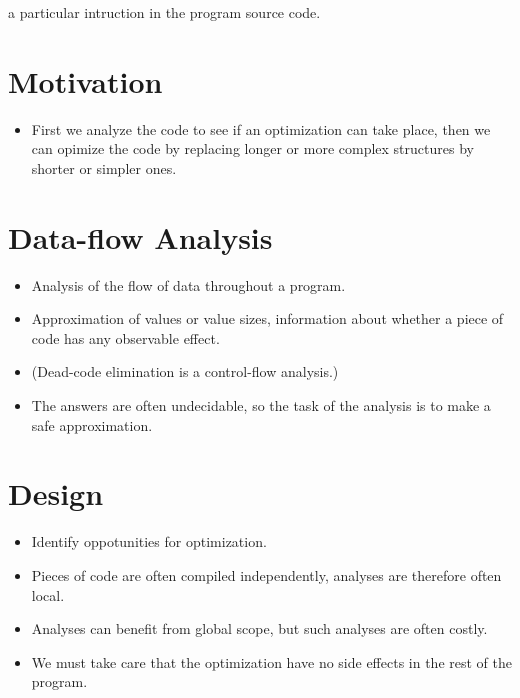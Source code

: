 \tableofcontents

\begin{description}[\setleftmargin{20pt}\setlabelstyle{\bf}\breaklabel]

\item [Program point] a particular intruction in the program source code.

\end{description}

\section{Motivation}

\begin{itemize}

\item First we analyze the code to see if an optimization can take place, then
we can opimize the code by replacing longer or more complex structures by
shorter or simpler ones.

\end{itemize}

\section{Data-flow Analysis}

\begin{itemize}

\item Analysis of the flow of data throughout a program.

\item Approximation of values or value sizes, information about whether a piece
of code has any observable effect.

\item (Dead-code elimination is a control-flow analysis.)

\item The answers are often undecidable, so the task of the analysis is to make
a safe approximation.

\end{itemize}


\section{Design}

\begin{itemize}

\item Identify oppotunities for optimization.

\item Pieces of code are often compiled independently, analyses are therefore
often local.

\item Analyses can benefit from global scope, but such analyses are often
costly.

\item We must take care that the optimization have no side effects in the rest
of the program.

\end{itemize}

